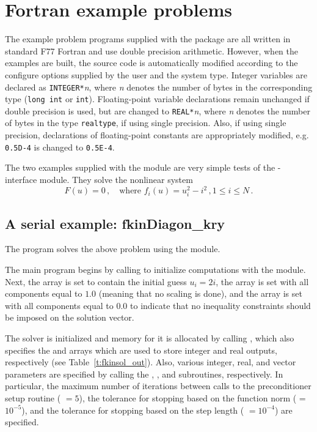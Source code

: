 \section{Fortran example problems}\label{s:ex_fortran}

The {\F} example problem programs supplied with the {\kinsol}
package are all written in standard F77 Fortran and use double precision
arithmetic. However, when the {\F} examples are built, the source code is
automatically modified according to the configure options supplied by the
user and the system type. Integer variables are declared as {\tt INTEGER*}{\em n},
where {\em n} denotes the number of bytes in the corresponding {\CC} type
({\tt long int} or {\tt int}). Floating-point variable declarations remain
unchanged if double precision is used, but are changed to {\tt REAL*}{\em n},
where {\em n} denotes the number of bytes in the {\sundials} type {\tt realtype},
if using single precision. Also, if using single precision, declarations of
floating-point constants are appropriately modified, e.g. {\tt 0.5D-4} is
changed to {\tt 0.5E-4}.


The two examples supplied with the {\fkinsol} module are very simple tests 
of the {\F}-{\CC} interface module. 
They solve the nonlinear system
\begin{equation*}
  F(u) = 0 \, , \quad \text{where } f_i(u) = u_i^2 - i^2 \, , 1 \le i \le N \, . 
\end{equation*}

\subsection{A serial example: fkinDiagon\_kry}\label{ss:fkinDiagon_kry}

The  program solves the above problem using the {\nvecs} module.

The main program begins by calling  to initialize computations
with the {\nvecs} module. Next, the array  is set to contain
the initial guess $u_i = 2 i$, the array  is set with all 
components equal to $1.0$ (meaning that no scaling is done), and the array
 is set with all components equal to $0.0$ to indicate that no 
inequality constraints should be imposed on the solution vector.

The {\kinsol} solver is initialized and memory for it is allocated by
calling , which also specifies the  and 
arrays which are used to store integer and real outputs, respectively
(see Table~\ref{t:fkinsol_out}). Also,
various integer, real, and vector parameters are specified by calling the
, , and  subroutines,
respectively. In particular, the maximum number of 
iterations between calls to the preconditioner setup routine ( $=5$),
the tolerance for stopping based on the function norm ( = $10^{-5}$),
and the tolerance for stopping based on the step length ( $=10^{-4}$)
are specified.

